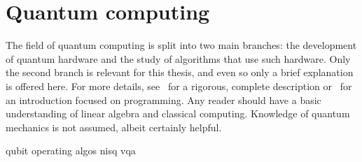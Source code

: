 \chapter{Quantum computing}
\label{chap:qc}
The field of quantum computing is split into two main branches: the development of quantum hardware and the study of algorithms that use such hardware.
Only the second branch is relevant for this thesis, and even so only a brief explanation is offered here.
For more details, see~\autocite{nielsen2012} for a rigorous, complete description or~\autocite{qiskit_textbook} for an introduction focused on programming.
Any reader should have a basic understanding of linear algebra and classical computing.
Knowledge of quantum mechanics is not assumed, albeit certainly helpful.

{qubit}
{operating}
{algos}
{nisq}
{vqa}




